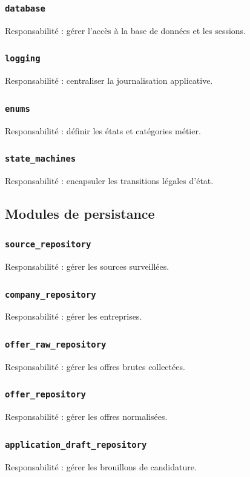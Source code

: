 \documentclass[11pt,a4paper]{article}
\begin{document}
\subsubsection{\texttt{database}}
Responsabilité : gérer l’accès à la base de données et les sessions.

\subsubsection{\texttt{logging}}
Responsabilité : centraliser la journalisation applicative.

\subsubsection{\texttt{enums}}
Responsabilité : définir les états et catégories métier.

\subsubsection{\texttt{state\_machines}}
Responsabilité : encapsuler les transitions légales d’état.

\subsection{Modules de persistance}

\subsubsection{\texttt{source\_repository}}
Responsabilité : gérer les sources surveillées.

\subsubsection{\texttt{company\_repository}}
Responsabilité : gérer les entreprises.

\subsubsection{\texttt{offer\_raw\_repository}}
Responsabilité : gérer les offres brutes collectées.

\subsubsection{\texttt{offer\_repository}}
Responsabilité : gérer les offres normalisées.

\subsubsection{\texttt{application\_draft\_repository}}
Responsabilité : gérer les brouillons de candidature.
\end{document}
